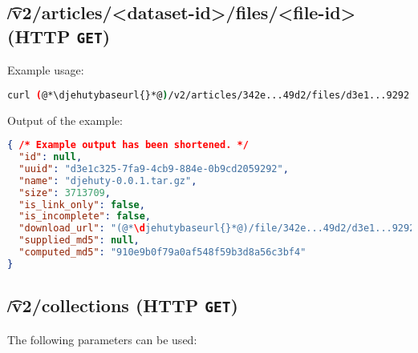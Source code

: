 \subsection{\t{/v2/articles/<dataset-id>/files/<file-id>} (HTTP \texttt{GET})}

  Example usage:
\begin{lstlisting}[language=bash]
curl (@*\djehutybaseurl{}*@)/v2/articles/342e...49d2/files/d3e1...9292 | jq
\end{lstlisting}

  Output of the example:
\begin{lstlisting}[language=JSON]
{ /* Example output has been shortened. */
  "id": null,
  "uuid": "d3e1c325-7fa9-4cb9-884e-0b9cd2059292",
  "name": "djehuty-0.0.1.tar.gz",
  "size": 3713709,
  "is_link_only": false,
  "is_incomplete": false,
  "download_url": "(@*\djehutybaseurl{}*@)/file/342e...49d2/d3e1...9292",
  "supplied_md5": null,
  "computed_md5": "910e9b0f79a0af548f59b3d8a56c3bf4"
}
\end{lstlisting}

\subsection{\t{/v2/collections} (HTTP \texttt{GET})}
\label{sec:v2-collections}

  The following parameters can be used:

